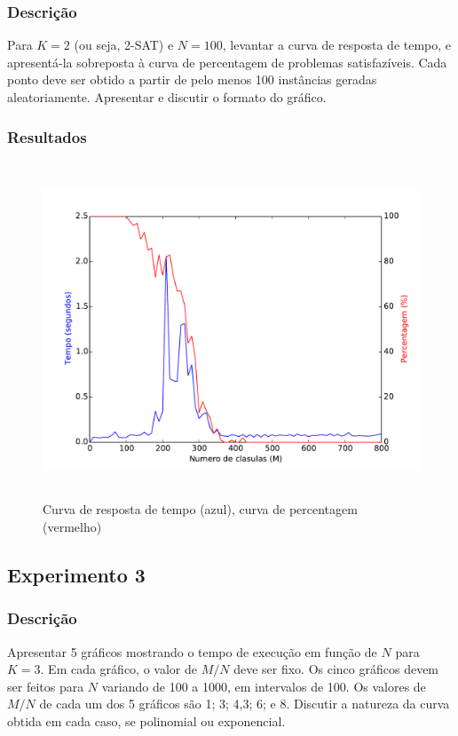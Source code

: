 	\subsubsection{Descrição}
		Para $K = 2$ (ou seja, 2-SAT) e $N = 100$, levantar a curva de resposta de tempo, e apresentá-la sobreposta à curva de percentagem de problemas satisfazíveis. Cada ponto deve ser obtido a partir de pelo menos 100 instâncias geradas aleatoriamente. Apresentar e discutir o formato do gráfico.
	\subsubsection{Resultados}
		\begin{figure}[H]
			\centering
			\includegraphics[height=10cm]{images/max2sat_100at}
			\caption{Curva de resposta de tempo (azul), curva de percentagem (vermelho)}
			\label{fig:max2sat100at}
		\end{figure}

\subsection{Experimento 3}
	\subsubsection{Descrição}
		Apresentar 5 gráficos mostrando o tempo de execução em função de $N$ para $K = 3$. Em cada gráfico, o valor de $M / N$ deve ser fixo. Os cinco gráficos devem ser feitos para $N$ variando de 100 a 1000, em intervalos de 100. Os valores de $M / N$ de cada um dos 5 gráficos são 1; 3; 4,3; 6; e 8. Discutir a natureza da curva obtida em cada caso, se polinomial ou exponencial.
